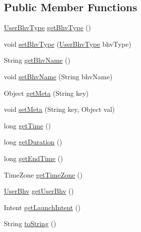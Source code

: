 \subsection*{\-Public \-Member \-Functions}
\begin{DoxyCompactItemize}
\item 
\hyperlink{enumlab_1_1davidahn_1_1appshuttle_1_1collect_1_1bhv_1_1_user_bhv_type}{\-User\-Bhv\-Type} \hyperlink{classlab_1_1davidahn_1_1appshuttle_1_1collect_1_1bhv_1_1_duration_user_bhv_a562e953f9289676ec002602e68e3649c}{get\-Bhv\-Type} ()
\item 
void \hyperlink{classlab_1_1davidahn_1_1appshuttle_1_1collect_1_1bhv_1_1_duration_user_bhv_acb88ad3acbcab2e7a7d8ad53013dcd6f}{set\-Bhv\-Type} (\hyperlink{enumlab_1_1davidahn_1_1appshuttle_1_1collect_1_1bhv_1_1_user_bhv_type}{\-User\-Bhv\-Type} bhv\-Type)
\item 
\-String \hyperlink{classlab_1_1davidahn_1_1appshuttle_1_1collect_1_1bhv_1_1_duration_user_bhv_ac3dd4577e79d9c6d2596b850375bf4c5}{get\-Bhv\-Name} ()
\item 
void \hyperlink{classlab_1_1davidahn_1_1appshuttle_1_1collect_1_1bhv_1_1_duration_user_bhv_a705dba630b1df39ff9a5f8d150f774d4}{set\-Bhv\-Name} (\-String bhv\-Name)
\item 
\-Object \hyperlink{classlab_1_1davidahn_1_1appshuttle_1_1collect_1_1bhv_1_1_duration_user_bhv_a990cede6ab483ecaba25c75c090405e3}{get\-Meta} (\-String key)
\item 
void \hyperlink{classlab_1_1davidahn_1_1appshuttle_1_1collect_1_1bhv_1_1_duration_user_bhv_a6f4b60bb74ca483348a04512a74c5c31}{set\-Meta} (\-String key, \-Object val)
\item 
long \hyperlink{classlab_1_1davidahn_1_1appshuttle_1_1collect_1_1bhv_1_1_duration_user_bhv_a47ad88f90c52264c12acb35e36199d02}{get\-Time} ()
\item 
long \hyperlink{classlab_1_1davidahn_1_1appshuttle_1_1collect_1_1bhv_1_1_duration_user_bhv_a2696b810045ffb56c7fe8e260b2109e3}{get\-Duration} ()
\item 
long \hyperlink{classlab_1_1davidahn_1_1appshuttle_1_1collect_1_1bhv_1_1_duration_user_bhv_a46ad5b008899b7d7e89d3a48f2e64e69}{get\-End\-Time} ()
\item 
\-Time\-Zone \hyperlink{classlab_1_1davidahn_1_1appshuttle_1_1collect_1_1bhv_1_1_duration_user_bhv_a8387a4b0279cc1c91fe921d7de78528d}{get\-Time\-Zone} ()
\item 
\hyperlink{interfacelab_1_1davidahn_1_1appshuttle_1_1collect_1_1bhv_1_1_user_bhv}{\-User\-Bhv} \hyperlink{classlab_1_1davidahn_1_1appshuttle_1_1collect_1_1bhv_1_1_duration_user_bhv_a23b6a888adb88aad858d95160804cc0a}{get\-User\-Bhv} ()
\item 
\-Intent \hyperlink{classlab_1_1davidahn_1_1appshuttle_1_1collect_1_1bhv_1_1_duration_user_bhv_a1767610bc1073de8a066025c17146a38}{get\-Launch\-Intent} ()
\item 
\-String \hyperlink{classlab_1_1davidahn_1_1appshuttle_1_1collect_1_1bhv_1_1_duration_user_bhv_a1fd0cad5b53b3182d7653228e19d9641}{to\-String} ()
\end{DoxyCompactItemize}


